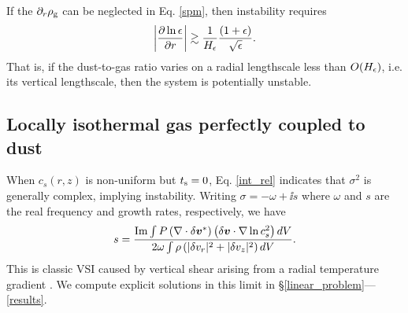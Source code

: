 If the $\partial_r\rho_\mathrm{g}$ can be neglected in Eq. \ref{spm}, then instability
requires 
\begin{align}
  \left|\frac{\partial\ln{\epsilon}}{\partial r}\right| \gtrsim
  \frac{1}{H_\epsilon}\frac{\left(1+\epsilon\right)}{\sqrt{\epsilon}}. 
\end{align}
That is, if the dust-to-gas ratio varies on a radial lengthscale less
than $O(H_\epsilon)$, i.e. its vertical lengthscale,  
then the system is potentially unstable.   



\subsection{Locally isothermal gas perfectly coupled to dust}\label{dusty_vsi_int}
When $c_s(r,z)$ is non-uniform but $t_\mathrm{s}=0$, Eq. \ref{int_rel}
indicates that $\sigma^2$ is generally complex, implying instability.  
Writing $\sigma = 
-\omega + \ii s$ where $\omega$ and $s$ are the real frequency and
growth rates, respectively, we have 
\begin{align}
  s = \frac{\operatorname{Im}\int P
  \left(\nabla\cdot\delta\bm{v}^*\right)\left(\delta\bm{v}\cdot\nabla\ln{c_s^2}\right)dV}{2\omega\int\rho\left(|\delta
    v_r|^2 + |\delta v_z|^2\right)dV}. \label{vsi_check}
\end{align} 
This is classic VSI caused by vertical shear arising from a radial
temperature gradient \citep{nelson13,barker15,lin15}. We compute
explicit solutions in this limit in
\S\ref{linear_problem}---\ref{results}. 


